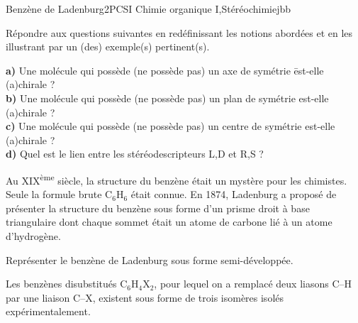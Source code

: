 
\begin{exercise}{Benzène de Ladenburg}{2}{PCSI}
{Chimie organique I,Stéréochimie}{jbb}

\begin{questions}
\questioncours Répondre aux questions suivantes en redéfinissant les notions abordées et en les illustrant par un (des) exemple(s) pertinent(s).
\hspace*{-1ex}\begin{tabbing}
    \textsf{\bfseries a) } Une molécule qui possède (ne possède pas) un axe de symétrie \hspace{3ex} \= est-elle (a)chirale ? \\
    \textsf{\bfseries b) } Une molécule qui possède (ne possède pas) un plan de symétrie \> est-elle (a)chirale ? \\
    \textsf{\bfseries c) } Une molécule qui possède (ne possède pas) un centre de symétrie \> est-elle (a)chirale ? \\
    \textsf{\bfseries d) } Quel est le lien entre les stéréodescripteurs L,D et R,S ?
\end{tabbing}


\begin{EnvUplevel}
    Au XIX\textsuperscript{ème} siècle, la structure du benzène était un mystère pour les chimistes. Seule la formule brute $\mathrm{C_6H_6}$ était connue. En 1874, Ladenburg a proposé de présenter la structure du benzène sous forme d'un prisme droit à base triangulaire dont chaque sommet était un atome de carbone lié à un atome d'hydrogène.
\end{EnvUplevel}

\question Représenter le benzène de Ladenburg sous forme semi-développée.

\question Les benzènes disubstitués $\mathrm{C_6H_4X_2}$, pour lequel on a remplacé deux liasons C--H par une liaison C--X, existent sous forme de trois isomères isolés expérimentalement.


\end{questions}
\end{exercise}
